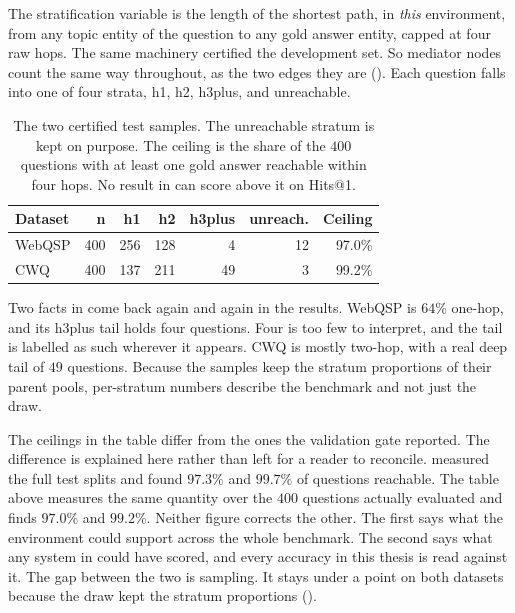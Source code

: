 The stratification variable is the length of the shortest
path, in \emph{this} environment, from any topic entity of the question to any
gold answer entity, capped at four raw hops. The same machinery certified the
development set. So mediator nodes count the same way throughout, as the two
edges they are (). Each question falls into one of four
strata, \textsf{h1}, \textsf{h2}, \textsf{h3plus}, and \textsf{unreachable}.

\begin{table}[!tb]
  \begin{center}
    \caption[The two certified test samples]{The two certified test samples. The
    unreachable stratum is kept on purpose. The ceiling is the share of the
    $400$ questions with at least one gold answer reachable within four hops. No
    result in  can score above it on Hits@1.}
    \label{tab:testsets}
    \begin{tabular}{|l|r|r|r|r|r|r|}
      \hline
      \textbf{Dataset} & \textbf{n} & \textbf{h1} & \textbf{h2} &
      \textbf{h3plus} & \textbf{unreach.} & \textbf{Ceiling} \\
      \hline
      WebQSP & 400 & 256 & 128 & 4  & 12 & 97.0\% \\
      CWQ    & 400 & 137 & 211 & 49 & 3  & 99.2\% \\
      \hline
    \end{tabular}
  \end{center}
\end{table}

Two facts in  come back again and again in the results.
WebQSP is $64\%$ one-hop, and its \textsf{h3plus} tail holds four questions.
Four is too few to interpret, and the tail is labelled as such wherever it
appears. CWQ is mostly two-hop, with a real deep tail of $49$ questions. Because
the samples keep the stratum proportions of their parent pools, per-stratum
numbers describe the benchmark and not just the draw.

The ceilings in the table differ from the ones the validation gate reported. The
difference is explained here rather than left for a reader to reconcile.
 measured the full test splits and found $97.3\%$ and
$99.7\%$ of questions reachable. The table above measures the same quantity over
the $400$ questions actually evaluated and finds $97.0\%$ and $99.2\%$. Neither
figure corrects the other. The first says what the environment could support
across the whole benchmark. The second says what any system in
 could have scored, and every accuracy in this thesis is read
against it. The gap between the two is sampling. It stays under a point on both
datasets because the draw kept the stratum proportions
().

